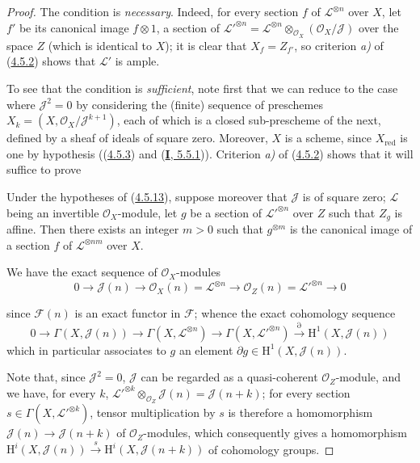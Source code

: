 \begin{proof}
The condition is \emph{necessary}. Indeed, for every section $f$ of
$\mathcal{L}^{\otimes n}$ over $X$, let $f'$ be its canonical image
$f\otimes1$, a section of
$\mathcal{L}'^{\otimes n}=\mathcal{L}^{\otimes n}
\otimes_{\mathcal{O}_X}(\mathcal{O}_X/\mathcal{J})$ over the space
$Z$ (which is identical to $X$); it is clear that $X_f=Z_{f'}$, so
criterion \emph{a)} of (\hyperref[II.4.5.2]{4.5.2}) shows that $\mathcal{L}'$ is
ample.

To see that the condition is \emph{sufficient}, note first that we can
reduce to the case where $\mathcal{J}^2=0$ by considering the (finite) sequence of
preschemes
$X_k=(X,\mathcal{O}_X/\mathcal{J}^{k+1})$, each of which is a closed
sub-prescheme of the next, defined by a sheaf of ideals of square zero. Moreover,
$X$ is a scheme, since $X_{\mathrm{red}}$ is one by hypothesis
((\hyperref[II.4.5.3]{4.5.3}) and
(\hyperref[I.5.5.1]{\textbf{I}, 5.5.1})). Criterion \emph{a)} of
(\hyperref[II.4.5.2]{4.5.2}) shows that it will suffice to prove

\begin{lemma}[4.5.13.1]
\label{II.4.5.13.1}
Under the hypotheses of \textup{(\hyperref[II.4.5.13]{4.5.13})}, suppose moreover
that $\mathcal{J}$ is of square zero; $\mathcal{L}$ being an
invertible $\mathcal{O}_X$-module, let $g$ be a section of
$\mathcal{L}'^{\otimes n}$ over $Z$ such that $Z_g$ is affine.
Then there exists an integer $m>0$ such that $g^{\otimes m}$ is the
canonical image of a section $f$ of $\mathcal{L}^{\otimes nm}$ over $X$.
\end{lemma}

We have the exact sequence of $\mathcal{O}_X$-modules
\[
  0\longrightarrow\mathcal{J}(n)\longrightarrow
  \mathcal{O}_X(n)=\mathcal{L}^{\otimes n}\longrightarrow
  \mathcal{O}_Z(n)=\mathcal{L}'^{\otimes n}\longrightarrow0
\]


since $\mathcal{F}(n)$ is an exact functor in $\mathcal{F}$; whence the
exact cohomology sequence
\[
  0\longrightarrow\Gamma(X,\mathcal{J}(n))\longrightarrow
  \Gamma(X,\mathcal{L}^{\otimes n})\longrightarrow
  \Gamma(X,\mathcal{L}'^{\otimes n})\xrightarrow{\partial}
  \mathrm{H}^1(X,\mathcal{J}(n))
\]
which in particular associates to $g$ an element
$\partial g\in\mathrm{H}^1(X,\mathcal{J}(n))$.

Note that, since $\mathcal{J}^2=0$, $\mathcal{J}$ can be regarded
as a quasi-coherent $\mathcal{O}_Z$-module, and we have, for every $k$,
$\mathcal{L}'^{\otimes k}\otimes_{\mathcal{O}_Z}\mathcal{J}(n)
=\mathcal{J}(n+k)$; for every section
$s\in\Gamma(X,\mathcal{L}'^{\otimes k})$, tensor multiplication by
$s$ is therefore a homomorphism $\mathcal{J}(n)\to\mathcal{J}(n+k)$ of
$\mathcal{O}_Z$-modules, which consequently gives a homomorphism
$\mathrm{H}^i(X,\mathcal{J}(n))\xrightarrow{s}
\mathrm{H}^i(X,\mathcal{J}(n+k))$ of cohomology groups.


\end{proof}
